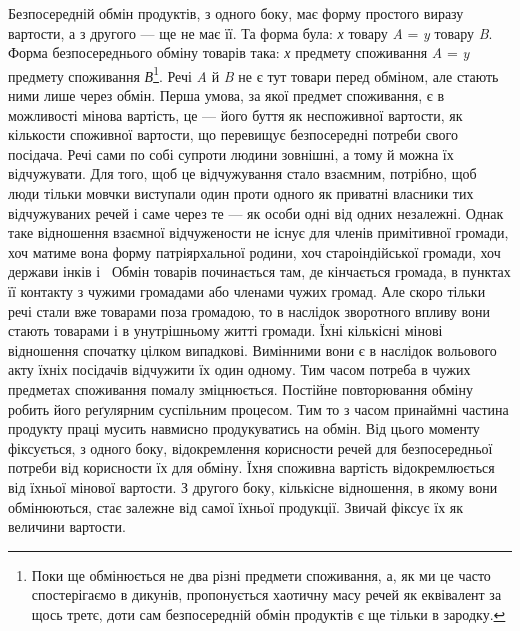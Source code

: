 Безпосередній обмін продуктів, з одного боку, має форму
простого виразу вартости, а з другого — ще не має її. Та форма
була: \emph{х} товару \emph{A} = \emph{y} товару \emph{B}. Форма безпосереднього обміну
товарів така: \emph{х} предмету споживання \emph{A} = \emph{y} предмету споживання
\emph{В}\footnote{
Поки ще обмінюється не два різні предмети споживання, а, як
ми це часто спостерігаємо в дикунів, пропонується хаотичну масу речей
як еквівалент за щось третє, доти сам безпосередній обмін продуктів є
ще тільки в зародку.
}. Речі \emph{A} й \emph{B} не є тут товари перед обміном, але стають ними
лише через обмін. Перша умова, за якої предмет споживання,
є в можливості мінова вартість, це — його буття як неспоживної
вартости, як кількости споживної вартости, що перевищує
безпосередні потреби свого посідача. Речі сами по собі супроти
людини зовнішні, а тому й можна їх відчужувати. Для того,
щоб це відчужування стало взаємним, потрібно, щоб люди тільки
мовчки виступали один проти одного як приватні власники тих
відчужуваних речей і саме через те — як особи одні від одних
незалежні. Однак таке відношення взаємної відчужености не
існує для членів примітивної громади, хоч матиме вона форму
патріярхальної родини, хоч староіндійської громади, хоч держави
інків і~ Обмін товарів починається там, де кінчається
громада, в пунктах її контакту з чужими громадами або членами
чужих громад. Але скоро тільки речі стали вже товарами поза
громадою, то в наслідок зворотного впливу вони стають товарами
і в унутрішньому житті громади. Їхні кількісні мінові відношення
спочатку цілком випадкові. Вимінними вони є в наслідок
вольового акту їхніх посідачів відчужити їх один одному. Тим часом
потреба в чужих предметах споживання помалу зміцнюється.
Постійне повторювання обміну робить його реґулярним
суспільним процесом. Тим то з часом принаймні частина продукту
праці мусить навмисно продукуватись на обмін. Від цього моменту
фіксується, з одного боку, відокремлення корисности речей
для безпосередньої потреби від корисности їх для обміну. Їхня
споживна вартість відокремлюється від їхньої мінової вартости.
З другого боку, кількісне відношення, в якому вони обмінюються,
стає залежне від самої їхньої продукції. Звичай фіксує їх як
величини вартости.

